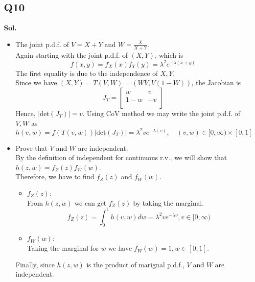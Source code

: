 \documentclass[12pt]{article}
\begin{document}
\subsection*{Q10}
\textbf{Sol.} \\
\begin{itemize}
    \item The joint p.d.f. of \(V = X+Y\) and  \(W = \frac{X}{X+Y}\).
    \\ Again starting with the joint p.d.f. of \((X,Y)\), which is 
    \[
      f(x,y) = f_X(x)f_Y(y) = \lambda ^{2} e^{-\lambda (x+y)}
    \]  
    The first equality is due to the independence of \(X,Y\).  
    \\Since we have \((X,Y) = T(V,W) = (WV, V(1-W))\), the Jacobian is
    \[
      J_T = \begin{bmatrix}
         w &  v \\
         1-w & -v  \\
      \end{bmatrix}
    \] 
    Hence,  \(|\text{det}(J_T)| = v\).
    Using CoV method we may write the joint p.d.f. of \(V,W\) as 
    \[
      h(v,w) = f(T(v,w))\left\vert \text{det}(J_T) \right\vert = \lambda ^2 v e^{-\lambda (v)} , \quad (v,w) \in [0,\infty) \times [0,1]  
    \]   

    \item Prove that \(V\) and \(W\) are independent. 
    \\By the definition of independent for continuous r.v., we will show that \(h(z,w) = f_Z(z)f_W(w)\). 
    \\ 
     Therefore, we have to find \(f_Z(z)\) and \(f_W(w)\). \\ 
     \begin{itemize}
         \item \(f_Z(z)\):\\
         From \(h(z,w)\) we can get \(f_Z(z)\) by taking the marginal. 
         \[
            f_Z(z) = \int_0^1 h(v,w)dw = \lambda ^2 v e^{-\lambda v}, v\in [0, \infty)
         \]   
         \item \(f_W(w)\):\\  
         Taking the marginal for \(w\) we have \(f_{W}(w) = 1 , w \in [0,1]\). 
     \end{itemize}  
     Finally, since \(h(z,w)\) is the product of marignal p.d.f., \(V\) and \(W\) are independent.  
\end{itemize}
\end{document}

